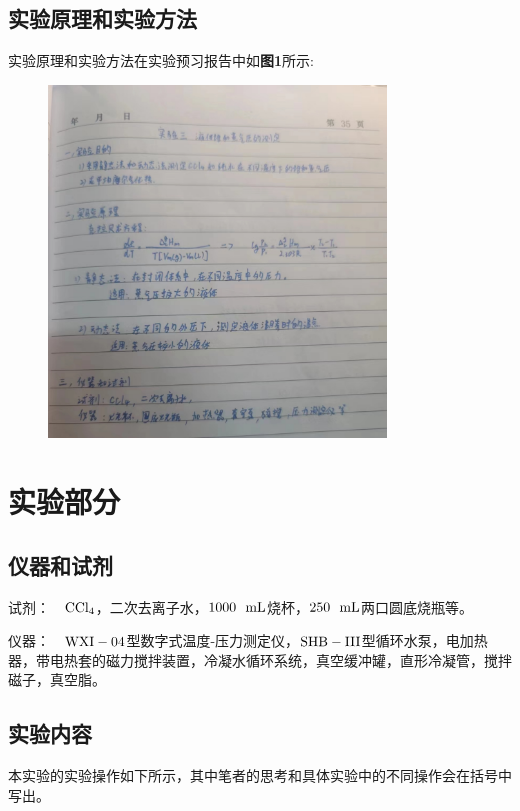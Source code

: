 \documentclass[12pt]{article}
\begin{document}
		\subsection{实验原理和实验方法}
		实验原理和实验方法在实验预习报告中如\textbf{图1}所示: \par
		\begin{figure}[h]
			\centering
			\includegraphics[width=0.8\textwidth]{1.png}
		\end{figure}
			
	     
    \section{实验部分}
    	\subsection{仪器和试剂}
			试剂：\ \ $\rm CCl_{4}$，二次去离子水，$1000\ \ {\rm mL}$烧杯，$250\ \ {\rm mL}$两口圆底烧瓶等。\par 
			仪器：\ \ $\rm WXI-04$型数字式温度-压力测定仪，$\rm SHB-III$型循环水泵，电加热器，带电热套的磁力搅拌装置，冷凝水循环系统，真空缓冲罐，直形冷凝管，搅拌磁子，真空脂。
    			
    	 \subsection{实验内容}
		 本实验的实验操作如下所示，其中笔者的思考和具体实验中的不同操作会在括号中写出。\par
\end{document}
